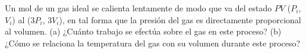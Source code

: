 \item Un mol de un gas ideal se calienta lentamente de modo que va del estado $PV$ ($P_i$, $V_i$) al ($3P_i$, $3V_i$), en tal forma que la presión del gas es directamente proporcional al volumen. (a) ¿Cuánto trabajo se efectúa sobre el gas en este proceso? (b) ¿Cómo se relaciona la temperatura del gas con su volumen durante este proceso?
